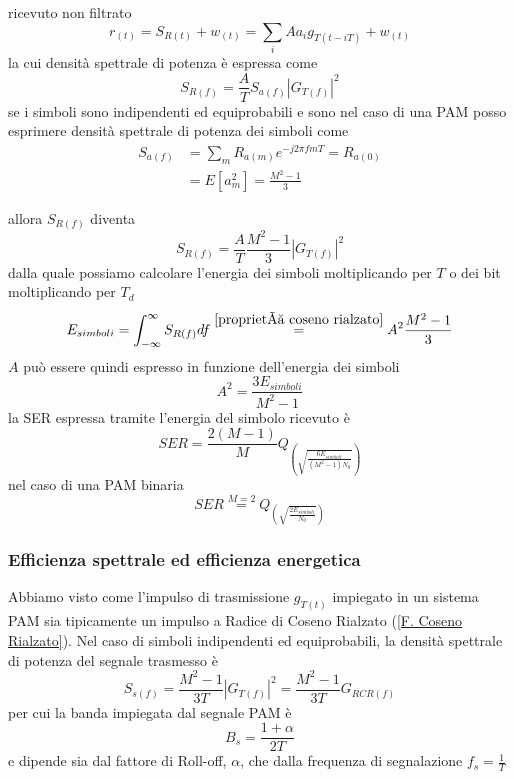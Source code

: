             ricevuto non filtrato 
            \[
                r_{(t)} = S_{R(t)} + w_{(t)} = \sum_{i}Aa_ig_{T(t-iT)}+w_{(t)}    
            \]
            la cui densità spettrale di potenza è espressa come
            \[
                S_{R(f)} = \frac{A}{T}S_{a(f)}\left|G_{T(f)}\right|^2
            \]
            se i simboli sono indipendenti ed equiprobabili e sono nel caso di una PAM posso esprimere 
            densità spettrale di potenza dei simboli come
            \begin{align}
                S_{a(f)} &= \sum_{m}R_{a(m)}e^{-j2\pi fmT} = R_{a(0)}\nonumber \\
                         &= E[a_m^2] = \frac{M^2-1}{3}\nonumber
            \end{align}
             
            allora $S_{R(f)}$ diventa
            \[
                S_{R(f)} = \frac{A}{T}\frac{M^2-1}{3}\left|G_{T(f)}\right|^2
            \]
            dalla quale possiamo calcolare l'energia dei simboli moltiplicando per $T$ o dei bit 
            moltiplicando per $T_d$ 
            \[
                E_{simboli} = \int_{-\infty}^{\infty}S_{R(f)} df \overset{\ref{proprietà coseno rialzato}}{=} A^2\frac{M^2-1}{3}  
            \]
            $A$ può essere quindi espresso in funzione dell'energia dei simboli 
            \[
                A^2 = \frac{3E_{simboli}}{M^2-1} 
            \]  
            la SER espressa tramite l'energia del simbolo ricevuto è
            \[
                SER = \frac{2(M-1)}{M} Q_{\displaystyle\left(\sqrt{\frac{6E_{simboli}}{(M^2-1)N_0}}\right)} 
            \]
            nel caso di una PAM binaria 
            \[
                SER \overset{M=2}{=} Q_{\displaystyle\left(\sqrt{\frac{2E_{simboli}}{N_0}}\right)} 
            \]
        \subsubsection{Efficienza spettrale ed efficienza energetica}
            Abbiamo visto come l'impulso di trasmissione $g_{T(t)}$ impiegato in un sistema PAM sia tipicamente 
            un impulso a Radice di Coseno Rialzato (\ref{F. Coseno Rialzato}). Nel caso di simboli indipendenti
            ed equiprobabili, la densità spettrale di potenza del segnale trasmesso è 
            \[
                S_{s(f)} = \frac{M^2-1}{3T}\left|G_{T(f)}\right|^2 = \frac{M^2-1}{3T} G_{RCR(f)}
            \]
            per cui la banda impiegata dal segnale PAM è 
            \[
                B_s = \frac{1+\alpha}{2T}
            \]
            e dipende sia dal fattore di Roll-off, $\alpha$, che dalla frequenza di segnalazione $f_s=\frac{1}{T}$
